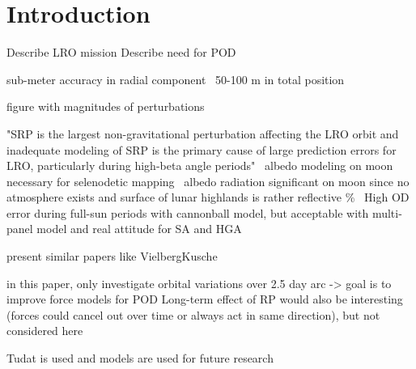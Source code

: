 \section{Introduction}

Describe LRO mission
Describe need for POD

sub-meter accuracy in radial component~\cite{Zuber2009}
50-100 m in total position~\cite{Chin2007}

figure with magnitudes of perturbations

"SRP is the largest non-gravitational perturbation affecting the LRO orbit and inadequate modeling of SRP is the primary cause of large prediction errors for LRO, particularly during high-beta angle periods"~\cite{Slojkowski2015}
albedo modeling on moon necessary for selenodetic mapping~\cite{Floberghagen1999}
albedo radiation significant on moon since no atmosphere exists and surface of lunar highlands is rather reflective \%~\cite{Floberghagen1999}
High OD error during full-sun periods with cannonball model, but acceptable with multi-panel model and real attitude for SA and HGA~\cite[]{Slojkowski2014}

present similar papers like VielbergKusche


in this paper, only investigate orbital variations over 2.5 day arc -> goal is to improve force models for POD
Long-term effect of RP would also be interesting (forces could cancel out over time or always act in same direction), but not considered here

Tudat is used and models are used for future research
